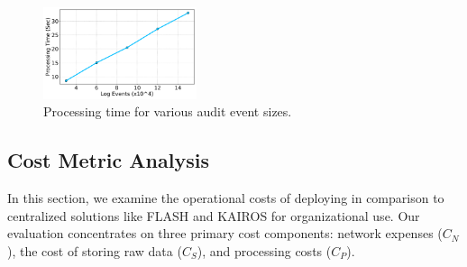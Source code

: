  \begin{figure}[t!]
  \centering
  \includegraphics[width=0.4\textwidth]{fig/sizevstime.pdf}
  \caption{Processing time for various audit event sizes. }
  \label{sizevstime}
  \vspace{-2ex}
\end{figure}




\subsection{Cost Metric Analysis}
\label{cost_metric}
In this section, we examine the operational costs of deploying \Sys in comparison to centralized solutions like FLASH and KAIROS for organizational use. Our evaluation concentrates on three primary cost components: network expenses (\(C_{N}\)), the cost of storing raw data (\(C_{S}\)), and processing costs (\(C_{P}\)).

